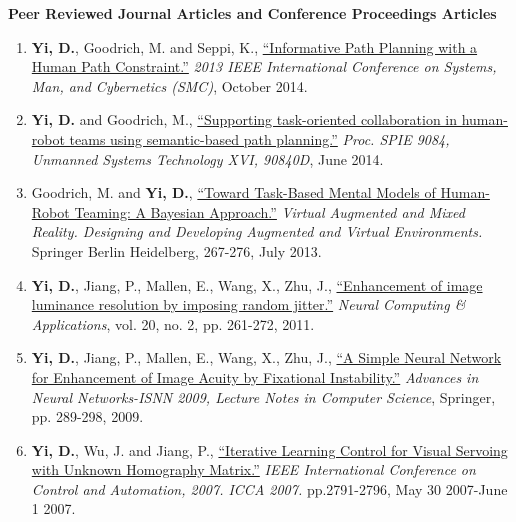 \documentclass[10pt]{article}
\makeatletter
\newlength{\bibhang}
\newlength{\bibsep}
 {\@listi \global\bibsep\itemsep \global\advance\bibsep by\parsep}
\newenvironment{bibsection}%
        {\begin{enumerate}{}{%
       \setlength{\leftmargin}{\bibhang}%
       \setlength{\itemindent}{-\leftmargin}%
       \setlength{\itemsep}{\bibsep}%
       \setlength{\parsep}{\z@}%
        \setlength{\partopsep}{0pt}%
        \setlength{\topsep}{0pt}}}
        {\end{enumerate}\vspace{-.6\baselineskip}}
\makeatother
\begin{document}
\textbf{Peer Reviewed Journal Articles and Conference Proceedings Articles}
\begin{bibsection}
    \item {\bf Yi, D.}, Goodrich, M. and Seppi, K., \href{http://ieeexplore.ieee.org/xpls/abs_all.jsp?arnumber=6974170}{``Informative Path Planning with a Human Path
    Constraint.''} \emph{2013 IEEE International Conference on Systems, Man, and Cybernetics (SMC)}, October 2014.
    
    \item {\bf Yi, D.} and Goodrich, M., \href{http://spie.org/Publications/Proceedings/Paper/10.1117/12.2050718}{``Supporting task-oriented collaboration in human-robot teams using semantic-based path planning.''} \emph{Proc. SPIE 9084, Unmanned Systems Technology XVI, 90840D}, June 2014.
    
    \item Goodrich, M. and {\bf Yi, D.}, \href{http://link.springer.com/chapter/10.1007\%2F978-3-642-39405-8_30}{``Toward Task-Based Mental Models of Human-Robot Teaming: A Bayesian Approach.''} \emph{Virtual Augmented and Mixed Reality. Designing and Developing Augmented and Virtual Environments.} Springer Berlin Heidelberg, 267-276, July 2013. 
    
    \item {\bf Yi, D.}, Jiang, P., Mallen, E., Wang, X., Zhu, J., \href{http://link.springer.com/article/10.1007\%2Fs00521-010-0433-1}{``Enhancement of image luminance resolution by imposing random jitter.''} \emph{Neural Computing \& Applications}, vol. 20, no. 2, pp. 261-272, 2011.
    
    \item {\bf Yi, D.}, Jiang, P., Mallen, E., Wang, X., Zhu, J., \href{http://link.springer.com/chapter/10.1007\%2F978-3-642-01513-7_31}{``A Simple Neural Network for Enhancement of Image Acuity by Fixational Instability.''} \emph{Advances in Neural Networks-ISNN 2009, Lecture Notes in Computer Science}, Springer, pp. 289-298, 2009.
    
    \item {\bf Yi, D.}, Wu, J. and Jiang, P., \href{http://ieeexplore.ieee.org/xpl/articleDetails.jsp?tp=&arnumber=4376870}{``Iterative Learning Control for Visual Servoing with Unknown Homography Matrix.''} \emph{IEEE International Conference on Control and Automation, 2007. ICCA 2007.} pp.2791-2796, May 30 2007-June 1 2007.
\end{bibsection}

\end{document}
